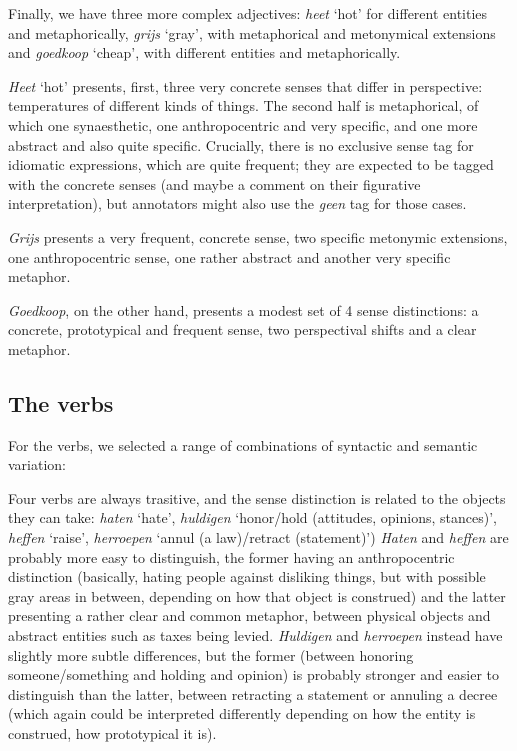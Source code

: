 \documentclass[
]{book}
\begin{document}
Finally, we have three more complex adjectives: \emph{heet} `hot' for different entities and metaphorically, \emph{grijs} `gray', with metaphorical and metonymical extensions and \emph{goedkoop} `cheap', with different entities and metaphorically.

\emph{Heet} `hot' presents, first, three very concrete senses that differ in perspective: temperatures of different kinds of things.
The second half is metaphorical, of which one synaesthetic, one anthropocentric and very specific, and one more abstract and also quite specific. Crucially, there is no exclusive sense tag for idiomatic expressions, which are quite frequent; they are expected to be tagged with the concrete senses (and maybe a comment on their figurative interpretation), but annotators might also use the \emph{geen} tag for those cases.

\emph{Grijs} presents a very frequent, concrete sense, two specific metonymic extensions, one anthropocentric sense, one rather abstract and another very specific metaphor.

\emph{Goedkoop}, on the other hand, presents a modest set of 4 sense distinctions: a concrete, prototypical and frequent sense, two perspectival shifts and a clear metaphor.

\hypertarget{verbs}{%
\subsection{The verbs}\label{verbs}}

For the verbs, we selected a range of combinations of syntactic and semantic variation:

Four verbs are always trasitive, and the sense distinction is related to the objects they can take: \emph{haten} `hate', \emph{huldigen} `honor/hold (attitudes, opinions, stances)', \emph{heffen} `raise', \emph{herroepen} `annul (a law)/retract (statement)')
\emph{Haten} and \emph{heffen} are probably more easy to distinguish, the former having an anthropocentric distinction (basically, hating people against disliking things, but with possible gray areas in between, depending on how that object is construed) and the latter presenting a rather clear and common metaphor, between physical objects and abstract entities such as taxes being levied.
\emph{Huldigen} and \emph{herroepen} instead have slightly more subtle differences, but the former (between honoring someone/something and holding and opinion) is probably stronger and easier to distinguish than the latter, between retracting a statement or annuling a decree (which again could be interpreted differently depending on how the entity is construed, how prototypical it is).
\end{document}
